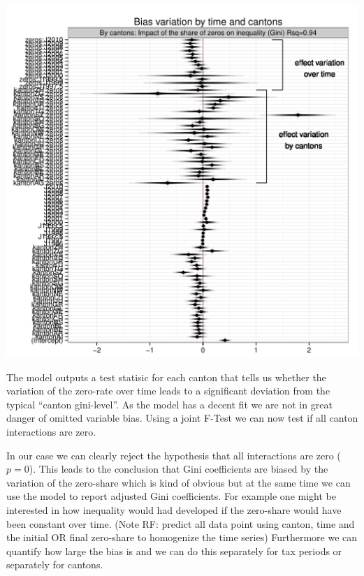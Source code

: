 \documentclass[twoside]{article}\usepackage[]{graphicx}\usepackage[]{color}
\makeatletter
\def\maxwidth{ %
  \ifdim\Gin@nat@width>\linewidth
    \linewidth
  \else
    \Gin@nat@width
  \fi
}
\newenvironment{knitrout}{}{} %
\makeatother
\begin{document}
\begin{multicols}{2}
\begin{knitrout}
\color{fgcolor}
\includegraphics[width=\maxwidth]{figure/corrected_gini} 

\end{knitrout}

The model outputs a test statisic for each canton that tells us whether the variation of the zero-rate over time leads to a significant deviation from the typical ``canton gini-level''. As the model has a decent fit we are not in great danger of omitted variable bias. Using a joint F-Test we can now test if all canton interactions are zero. 



In our case we can clearly reject the hypothesis that all interactions are zero ($p=0$). This leads to the conclusion  that Gini coefficients are biased by the variation of the zero-share which is kind of obvious but at the same time we can use the model to report adjusted Gini coefficients. For example one might be interested in how inequality would had developed if the zero-share would have been constant over time. (Note RF: predict all data point using canton, time and the initial OR final zero-share to homogenize the time series)
Furthermore we can quantify how large the bias is and we can do this separately for tax periods or separately for cantons. 


\end{multicols}
\end{document}
